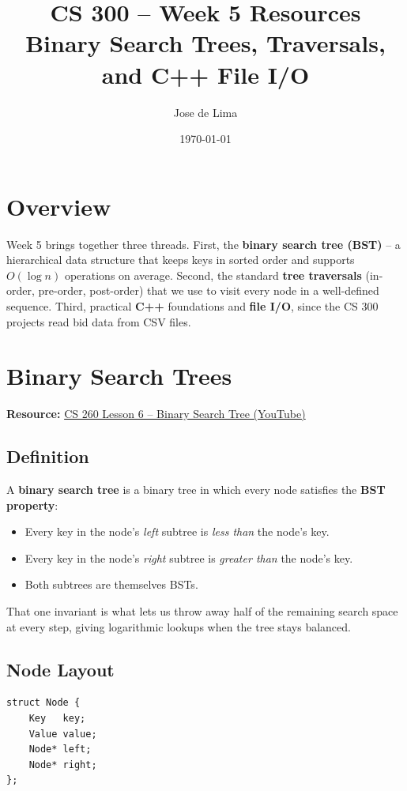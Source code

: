 \documentclass[11pt]{article}
\title{CS 300 -- Week 5 Resources\\\large Binary Search Trees, Traversals, and C++ File I/O}
\author{Jose de Lima}
\date{\today}
\begin{document}
\maketitle

\section*{Overview}
Week 5 brings together three threads. First, the \textbf{binary search
tree (BST)} -- a hierarchical data structure that keeps keys in sorted
order and supports $O(\log n)$ operations on average. Second, the
standard \textbf{tree traversals} (in-order, pre-order, post-order) that
we use to visit every node in a well-defined sequence. Third, practical
\textbf{C++} foundations and \textbf{file I/O}, since the CS 300 projects
read bid data from CSV files.

\section{Binary Search Trees}
\textbf{Resource:} \href{https://www.youtube.com/watch?v=kq0LPPNwvzQ}{CS 260 Lesson 6 -- Binary Search Tree (YouTube)}

\subsection*{Definition}
A \textbf{binary search tree} is a binary tree in which every node
satisfies the \textbf{BST property}:
\begin{itemize}[leftmargin=*]
    \item Every key in the node's \emph{left} subtree is \emph{less than}
          the node's key.
    \item Every key in the node's \emph{right} subtree is \emph{greater
          than} the node's key.
    \item Both subtrees are themselves BSTs.
\end{itemize}
That one invariant is what lets us throw away half of the remaining
search space at every step, giving logarithmic lookups when the tree
stays balanced.

\subsection*{Node Layout}
\begin{lstlisting}[basicstyle=\ttfamily\small,frame=single]
struct Node {
    Key   key;
    Value value;
    Node* left;
    Node* right;
};
\end{lstlisting}
\end{document}
